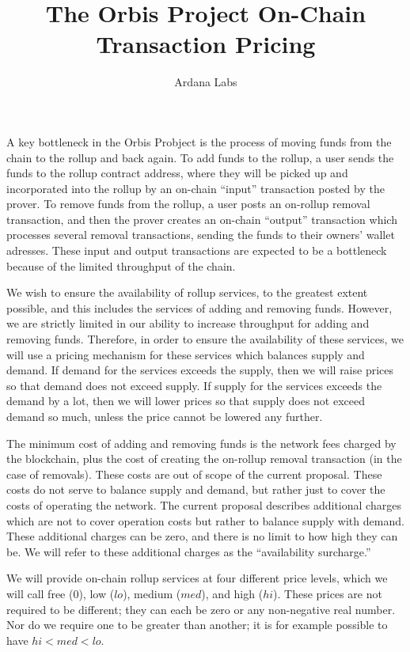 \documentclass[12pt]{article}
\title{The Orbis Project On-Chain Transaction Pricing}
\author{Ardana Labs}
\begin{document}
\maketitle


A key bottleneck in the Orbis Probject is the process of moving funds from the chain to the rollup and back again. To add funds to the rollup, a user sends the funds to the rollup contract address, where they will be picked up and incorporated into the rollup by an on-chain ``input'' transaction posted by the prover. To remove funds from the rollup, a user posts an on-rollup removal transaction, and then the prover creates an on-chain ``output'' transaction which processes several removal transactions, sending the funds to their owners' wallet adresses. These input and output transactions are expected to be a bottleneck because of the limited throughput of the chain. 

We wish to ensure the availability of rollup services, to the greatest extent possible, and this includes the services of adding and removing funds. However, we are strictly limited in our ability to increase throughput for adding and removing funds. Therefore, in order to ensure the availability of these services, we will use a pricing mechanism for these services which balances supply and demand. If demand for the services exceeds the supply, then we will raise prices so that demand does not exceed supply. If supply for the services exceeds the demand by a lot, then we will lower prices so that supply does not exceed demand so much, unless the price cannot be lowered any further.

The minimum cost of adding and removing funds is the network fees charged by the blockchain, plus the cost of creating the on-rollup removal transaction (in the case of removals). These costs are out of scope of the current proposal. These costs do not serve to balance supply and demand, but rather just to cover the costs of operating the network. The current proposal describes additional charges which are not to cover operation costs but rather to balance supply with demand. These additional charges can be zero, and there is no limit to how high they can be. We will refer to these additional charges as the ``availability surcharge.''

We will provide on-chain rollup services at four different price levels, which we will call free ($0$), low ($lo$), medium ($med$), and high ($hi$). These prices are not required to be different; they can each be zero or any non-negative real number. Nor do we require one to be greater than another; it is for example possible to have $hi < med < lo$.
\end{document}
